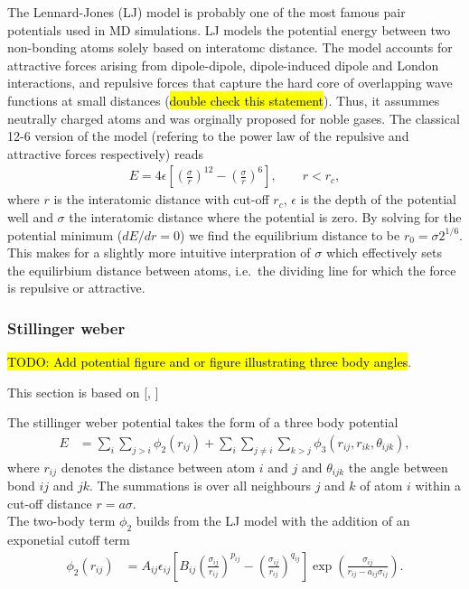 The Lennard-Jones (LJ) model is probably one of the most famous pair potentials
used in MD simulations. LJ models the potential energy between two non-bonding
atoms solely based on interatomc distance. The model accounts for attractive
forces arising from dipole-dipole, dipole-induced dipole and London
interactions, and repulsive forces that capture the hard core of overlapping wave functions at small distances (\hl{double check this statement}). Thus, it assummes
neutrally charged atoms and was orginally proposed for noble gases. The
classical 12-6 version of the model (refering to the power law of the repulsive
and attractive forces respectively) reads
\begin{align}
  E = 4\epsilon \left[\left(\frac{\sigma}{r}\right)^{12} - \left(\frac{\sigma}{r}\right)^6 \right ], \qquad r < r_c,
  \label{eq:LJ}
\end{align}
where $r$ is the interatomic distance with cut-off $r_c$, $\epsilon$ is the
depth of the potential well and $\sigma$ the interatomic distance where the potential is
zero. By solving for the potential minimum ($dE/dr = 0$) we find the equilibrium
distance to be $r_0 = \sigma 2^{1/6}$. This makes for a slightly more intuitive
interpration of $\sigma$ which effectively sets the equilirbium distance between
atoms, i.e.\ the dividing line for which the force is repulsive or
attractive. 




\subsubsection{Stillinger weber}
\hl{TODO: Add potential figure and or figure illustrating three body angles}.

This section is based on [\cite{docs_lammps_sw}, \cite{PhysRevB.31.5262}]

The stillinger weber potential takes the form of a three body potential
\begin{align*}
  E &=\sum_i \sum_{j>i} \phi_2(r_{i j})+\sum_i \sum_{j \neq i} \sum_{k>j} \phi_3(r_{ij}, r_{ik}, \theta_{ijk}),
\end{align*}
where $r_{ij}$ denotes the distance between atom $i$ and $j$ and $\theta_{ijk}$
the angle between bond $ij$ and $jk$. The summations is over all neighbours $j$
and $k$ of atom $i$ within a cut-off distance $r = a\sigma$. \\
The two-body term $\phi_2$ builds from the LJ model with the addition of an
exponetial cutoff term
\begin{align}
  \phi_2(r_{i j}) & =A_{ij} \epsilon_{ij}\left[B_{ij}\left(\frac{\sigma_{ij}}{r_{ij}}\right)^{p_{ij}} - \left(\frac{\sigma_{ij}}{r_{ij}}\right)^{q_{ij}}\right] \exp (\frac{\sigma_{ij}}{r_{ij}-a_{ij} \sigma_{ij}}).
  \label{eq:sw_2}
\end{align}

